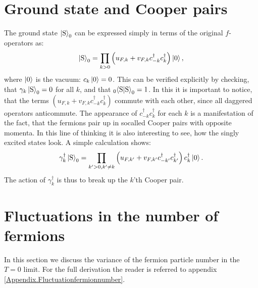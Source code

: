 \section{Ground state and Cooper pairs}
The ground state $\ket{\text{S}}_0$ can be expressed simply in terms of the original $f$-operators as:
\begin{equation}
\ket{\text{S}}_0 = \prod_{k > 0} \left(u_{F,k} + v_{F,k}c^\dagger_{-k}c^\dagger_k\right)\ket{0},
\end{equation} 
where $\ket{0}$ is the vacuum: $c_k\ket{0} = 0$. This can be verified explicitly by checking, that $\gamma_k\ket{\text{S}}_0 = 0$ for all $k$, and that $_{0}\!\braket{\text{S}|\text{S}}_0 = 1$. In this it is important to notice, that the terms $(u_{F,k} + v_{F,k}c^\dagger_{-k}c^\dagger_k)$ commute with each other, since all daggered operators anticommute. The appearance of $c^\dagger_{-k}c^\dagger_k$ for each $k$ is a manifestation of the fact, that the fermions pair up in socalled Cooper pairs with opposite momenta. In this line of thinking it is also interesting to see, how the singly excited states look. A simple calculation shows:
\begin{equation}
\gamma^\dagger_k\ket{\text{S}}_0 = \prod_{k' > 0, k' \neq k }\left(u_{F,k'} + v_{F,k'}c^\dagger_{-k'}c^\dagger_{k'}\right)c^\dagger_k\ket{0}.
\end{equation}
The action of $\gamma^\dagger_k$ is thus to break up the $k$'th Cooper pair. 

\section{Fluctuations in the number of fermions}
In this section we discuss the variance of the fermion particle number in the $T = 0$ limit. For the full derivation the reader is referred to appendix \ref{Appendix.Fluctuationfermionnumber}.

